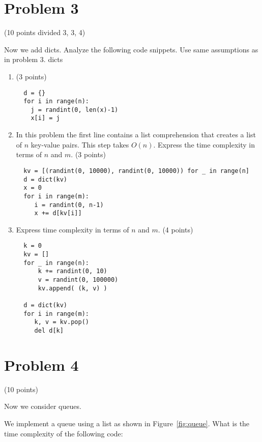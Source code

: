 \documentclass{article}
\begin{document}
\section{Problem 3} (10 points divided 3, 3, 4)

Now we add dicts.  Analyze the following code snippets. Use same
assumptions as in problem 3.  dicts

\begin{enumerate}[label=(\alph*)]

\item (3 points)
  
\begin{verbatim}
  d = {}
  for i in range(n):
    j = randint(0, len(x)-1)
    x[i] = j
\end{verbatim}

\item In this problem the first line contains a list comprehension that
  creates a list of $n$ key-value pairs.  This step takes $O(n)$.  Express
  the time complexity in terms of $n$ and $m$. (3 points)
  
\begin{verbatim}
  kv = [(randint(0, 10000), randint(0, 10000)) for _ in range(n]
  d = dict(kv)
  x = 0
  for i in range(m):
     i = randint(0, n-1)
     x += d[kv[i]]
\end{verbatim}

\item Express time complexity in terms of $n$ and $m$. (4 points)
  
\begin{verbatim}
  k = 0
  kv = []
  for _ in range(n):
      k += randint(0, 10)
      v = randint(0, 100000)
      kv.append( (k, v) )

  d = dict(kv)
  for i in range(m):
     k, v = kv.pop()
     del d[k]
\end{verbatim}
\end{enumerate}

\section{Problem 4} (10 points)

Now we consider queues.

We implement a queue using a list as shown in Figure~\ref{fig:queue}.
What is the time complexity of the following code:
\end{document}
